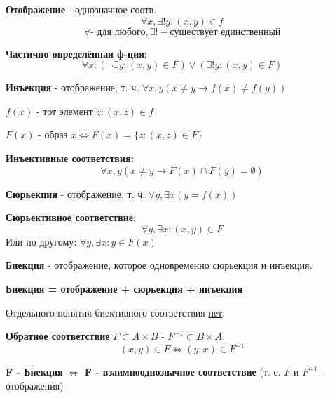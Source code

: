 \begin{definition}
\textbf{Отображение} - однозначное соотв.
\[
\forall x, \exists! y\colon (x, y) \in f
\] 
\[
\forall \text{- для любого}, \exists! - \text{существует единственный}
\] 
\end{definition}
\begin{definition}
\textbf{Частично определённая ф-ция}:
\[
  \forall x \colon (\neg \exists y \colon (x, y) \in F) \lor (\exists ! y \colon  (x, y) \in F)
\]
\end{definition}
\begin{definition}
\textbf{Инъекция} - отображение, т. ч. $\forall x, y (x \neq y \rightarrow f(x) \neq f(y))$
\end{definition}
\begin{definition}
    \textbf{$f(x)$} - тот элемент $z \colon (x, z) \in f$
\end{definition}
\begin{definition}
    $F(x)$ - образ $x \iff F(x) = \{z \colon (x, z) \in F\}$
\end{definition}
\begin{definition}
    \textbf{Инъективные соответствия:}
    \[
    \forall x, y (x \neq y \rightarrow F(x) \cap F(y) = \emptyset)
    \] 
\end{definition}
\begin{definition}
    \textbf{Сюрьекция} - отображение, т. ч. $\forall y, \exists x (y = f(x))$
\end{definition}
\begin{definition}
    \textbf{Сюрьективное соответствие}:
    \[
    \forall y, \exists x \colon  (x, y) \in F
    \] 
    Или по другому: $\forall y, \exists x \colon y \in F(x) $
\end{definition}
\begin{definition}
    \textbf{Биекция} - отображение, которое одновременно сюрьекция и инъекция.

    \textbf{Биекция = отображение + сюрьекция + инъекция}
\end{definition}
\begin{note}
    Отдельного понятия биективного соответствия \underline{нет}.
\end{note}
\begin{definition}
    \textbf{Обратное соответствие} $F \subset A \times B$ - $F^{-1} \subset B \times A$:
    \[
        (x, y) \in F \iff (y, x) \in F^{-1}
    \] 
\end{definition}
\begin{theorem}
    \textbf{F - Биекция} $\iff$ \textbf{F - взаимнооднозначное соответствие} (т. е. $F$ и $F^{-1}$ - отображения)
\end{theorem}
